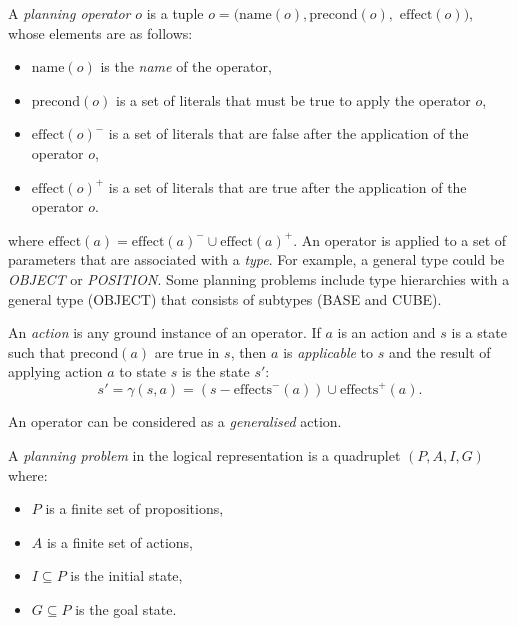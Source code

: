 \begin{definition}
A \textit{planning operator} $o$ is a tuple $o = (\text{name}(o), \text{precond}(o),$ $\text{effect}(o))$, whose elements are as follows:
\begin{itemize}
	\item $\text{name}(o)$ is the {\em name} of the operator,
	\item $\text{precond}(o)$ is a set of literals that must be true to apply the operator $o$,
	\item $\text{effect}(o)^{-}$ is a set of literals that are false after the application of the operator $o$,
	\item $\text{effect}(o)^{+}$ is a set of literals that are true after the application of the operator $o$.
\end{itemize}
\end{definition}
where $\text{effect}(a) = \text{effect}(a)^{-} \cup \text{effect}(a)^{+}$. 
An operator is applied to a set of parameters that are associated with a \textit{type}.
For example, a general type could be \textit{OBJECT} or \textit{POSITION}.
Some planning problems include type hierarchies with a general type (\eg OBJECT) that consists of subtypes (\eg BASE and CUBE).

\begin{definition}
	An \textit{action} is any ground instance of an operator. 
	If $a$ is an action and $s$ is a state such that $\text{precond}(a)$ are true in $s$, then $a$ is {\em applicable} to $s$ and the result of applying action $a$ to state $s$ is the state $s'$:  
	\[s' = \gamma(s, a) = (s - \text{effects}^{-}(a)) \cup \text{effects}^{+}(a).\]
\end{definition}

An operator can be considered as a \textit{generalised} action.

\begin{definition}
A \textit{planning problem} in the logical representation is a quadruplet $(P, A, I, G)$ where:
\begin{itemize}
	\item $P$ is a finite set of propositions,
	\item $A$ is a finite set of actions,%
	\item $I \subseteq P$ is the initial state,
	\item $G \subseteq P$ is the goal state.
\end{itemize}
\end{definition}


